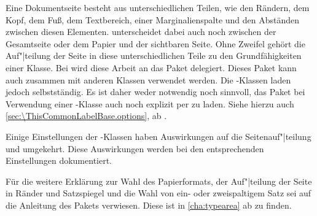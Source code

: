 Eine Dokumentseite besteht aus unterschiedlichen Teilen, wie den Rändern, dem
Kopf, dem Fuß, dem Textbereich, einer Marginalienspalte und den Abständen
zwischen diesen Elementen. \KOMAScript{} unterscheidet dabei auch noch
zwischen der Gesamtseite oder dem Papier und der sichtbaren Seite. Ohne
Zweifel gehört die Auf"|teilung der Seite in diese unterschiedlichen Teile zu
den Grundfähigkeiten einer
Klasse. Bei \KOMAScript{}
wird diese Arbeit an das Paket  delegiert. Dieses Paket kann
auch zusammen mit anderen Klassen verwendet werden. Die \KOMAScript-Klassen
laden  jedoch selbstständig. Es ist daher weder notwendig
noch sinnvoll, das Paket bei Verwendung einer \KOMAScript-Klasse auch noch
explizit per  zu laden. Siehe hierzu auch
\autoref{sec:\ThisCommonLabelBase.options}, ab
.

Einige Einstellungen der \KOMAScript{}-Klassen haben Auswirkungen auf die
Seitenauf"|teilung und umgekehrt. Diese Auswirkungen werden bei den
entsprechenden Einstellungen dokumentiert.

Für die weitere Erklärung zur Wahl des Papierformats, der Auf"|teilung der Seite
in Ränder und Satzspiegel und die Wahl von ein- oder zweispaltigem Satz sei
auf die Anleitung des Pakets  verwiesen. Diese ist in
\autoref{cha:typearea} ab  zu finden.



